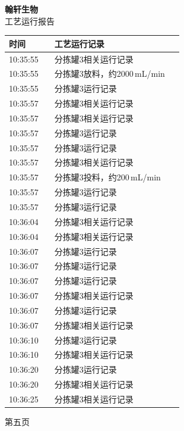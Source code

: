\documentclass[UTF8,10pt,a4paper,fontset=fandol]{ctexart}
\begin{document}
\noindent
\begin{minipage}[t]{0.47\linewidth}
\centering
\textbf{翰轩生物}\\[-1mm]
工艺运行报告

\vspace{2mm}
\scriptsize
\begin{tabular}{|p{0.24\linewidth}|p{0.68\linewidth}|}
\hline
时间 & 工艺运行记录 \\ \hline
10:35:55 & 分拣罐3相关运行记录 \\ \hline
10:35:55 & 分拣罐3放料，约2000\,mL/min \\ \hline
10:35:55 & 分拣罐3运行记录 \\ \hline
10:35:57 & 分拣罐3相关运行记录 \\ \hline
10:35:57 & 分拣罐3相关运行记录 \\ \hline
10:35:57 & 分拣罐3运行记录 \\ \hline
10:35:57 & 分拣罐3运行记录 \\ \hline
10:35:57 & 分拣罐3相关运行记录 \\ \hline
10:35:57 & 分拣罐3投料，约200\,mL/min \\ \hline
10:35:57 & 分拣罐3运行记录 \\ \hline
10:35:57 & 分拣罐3运行记录 \\ \hline
10:36:04 & 分拣罐3相关运行记录 \\ \hline
10:36:04 & 分拣罐3相关运行记录 \\ \hline
10:36:07 & 分拣罐3运行记录 \\ \hline
10:36:07 & 分拣罐3运行记录 \\ \hline
10:36:07 & 分拣罐3运行记录 \\ \hline
10:36:07 & 分拣罐3相关运行记录 \\ \hline
10:36:07 & 分拣罐3运行记录 \\ \hline
10:36:07 & 分拣罐3相关运行记录 \\ \hline
10:36:10 & 分拣罐3运行记录 \\ \hline
10:36:10 & 分拣罐3相关运行记录 \\ \hline
10:36:20 & 分拣罐3运行记录 \\ \hline
10:36:20 & 分拣罐3相关运行记录 \\ \hline
10:36:25 & 分拣罐3相关运行记录 \\ \hline
\end{tabular}

\vspace{1mm}

第五页
\end{minipage}
\end{document}
